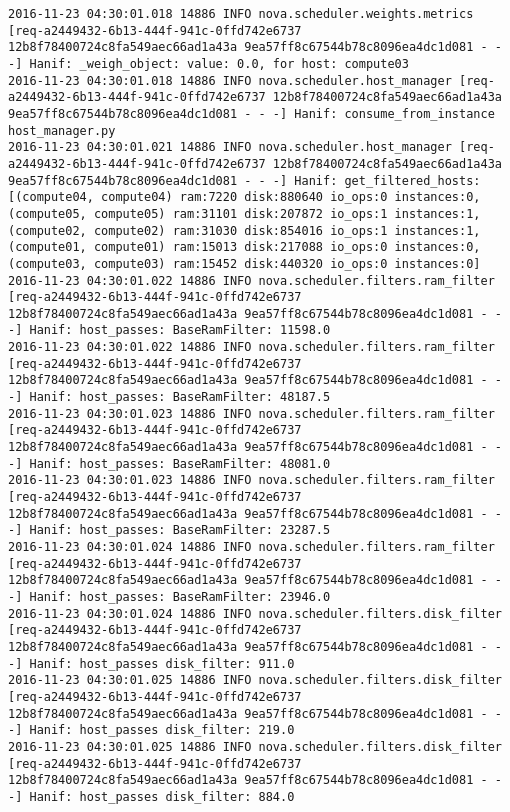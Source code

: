 \begin{lstlisting}[frame=single, caption={The filter scheduler log trace for 10 virtual instances}, label={lst:filterschedulercodetracelog10vi}, escapechar=|]
2016-11-23 04:30:01.018 14886 INFO nova.scheduler.weights.metrics [req-a2449432-6b13-444f-941c-0ffd742e6737 12b8f78400724c8fa549aec66ad1a43a 9ea57ff8c67544b78c8096ea4dc1d081 - - -] Hanif: _weigh_object: value: 0.0, for host: compute03
2016-11-23 04:30:01.018 14886 INFO nova.scheduler.host_manager [req-a2449432-6b13-444f-941c-0ffd742e6737 12b8f78400724c8fa549aec66ad1a43a 9ea57ff8c67544b78c8096ea4dc1d081 - - -] Hanif: consume_from_instance host_manager.py
2016-11-23 04:30:01.021 14886 INFO nova.scheduler.host_manager [req-a2449432-6b13-444f-941c-0ffd742e6737 12b8f78400724c8fa549aec66ad1a43a 9ea57ff8c67544b78c8096ea4dc1d081 - - -] Hanif: get_filtered_hosts: [(compute04, compute04) ram:7220 disk:880640 io_ops:0 instances:0, (compute05, compute05) ram:31101 disk:207872 io_ops:1 instances:1, (compute02, compute02) ram:31030 disk:854016 io_ops:1 instances:1, (compute01, compute01) ram:15013 disk:217088 io_ops:0 instances:0, (compute03, compute03) ram:15452 disk:440320 io_ops:0 instances:0]
2016-11-23 04:30:01.022 14886 INFO nova.scheduler.filters.ram_filter [req-a2449432-6b13-444f-941c-0ffd742e6737 12b8f78400724c8fa549aec66ad1a43a 9ea57ff8c67544b78c8096ea4dc1d081 - - -] Hanif: host_passes: BaseRamFilter: 11598.0
2016-11-23 04:30:01.022 14886 INFO nova.scheduler.filters.ram_filter [req-a2449432-6b13-444f-941c-0ffd742e6737 12b8f78400724c8fa549aec66ad1a43a 9ea57ff8c67544b78c8096ea4dc1d081 - - -] Hanif: host_passes: BaseRamFilter: 48187.5
2016-11-23 04:30:01.023 14886 INFO nova.scheduler.filters.ram_filter [req-a2449432-6b13-444f-941c-0ffd742e6737 12b8f78400724c8fa549aec66ad1a43a 9ea57ff8c67544b78c8096ea4dc1d081 - - -] Hanif: host_passes: BaseRamFilter: 48081.0
2016-11-23 04:30:01.023 14886 INFO nova.scheduler.filters.ram_filter [req-a2449432-6b13-444f-941c-0ffd742e6737 12b8f78400724c8fa549aec66ad1a43a 9ea57ff8c67544b78c8096ea4dc1d081 - - -] Hanif: host_passes: BaseRamFilter: 23287.5
2016-11-23 04:30:01.024 14886 INFO nova.scheduler.filters.ram_filter [req-a2449432-6b13-444f-941c-0ffd742e6737 12b8f78400724c8fa549aec66ad1a43a 9ea57ff8c67544b78c8096ea4dc1d081 - - -] Hanif: host_passes: BaseRamFilter: 23946.0
2016-11-23 04:30:01.024 14886 INFO nova.scheduler.filters.disk_filter [req-a2449432-6b13-444f-941c-0ffd742e6737 12b8f78400724c8fa549aec66ad1a43a 9ea57ff8c67544b78c8096ea4dc1d081 - - -] Hanif: host_passes disk_filter: 911.0
2016-11-23 04:30:01.025 14886 INFO nova.scheduler.filters.disk_filter [req-a2449432-6b13-444f-941c-0ffd742e6737 12b8f78400724c8fa549aec66ad1a43a 9ea57ff8c67544b78c8096ea4dc1d081 - - -] Hanif: host_passes disk_filter: 219.0
2016-11-23 04:30:01.025 14886 INFO nova.scheduler.filters.disk_filter [req-a2449432-6b13-444f-941c-0ffd742e6737 12b8f78400724c8fa549aec66ad1a43a 9ea57ff8c67544b78c8096ea4dc1d081 - - -] Hanif: host_passes disk_filter: 884.0

\end{lstlisting}
